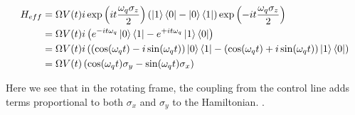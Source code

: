 \begin{fullwidth}
\begin{align}
    H_{eff} &= \Omega V(t) i \exp\left(it\frac{\omega_q \sigma_z}{2}\right)  (\ket{1}\bra{0} - \ket{0}\bra{1} )\exp\left(-it\frac{\omega_q \sigma_z}{2}\right) \\
            &= \Omega V(t) i \left(e^{-it\omega_q}\ket{0}\bra{1} -  e^{+it\omega_q}\ket{1}\bra{0} \right) \\
            &= \Omega V(t) i \left(\left(\cos(\omega_q t) - i\sin(\omega_q t)\right)\ket{0}\bra{1} -  \left(\cos(\omega_q t) + i\sin(\omega_q t)\right)\ket{1}\bra{0} \right) \\
            &= \Omega V(t) \left(\cos(\omega_q t)\sigma_y - \sin(\omega_q t) \sigma_x \right)
\end{align}
\end{fullwidth}
Here we see that in the rotating frame, the coupling from the control line adds terms proportional to both $\sigma_x$ and $\sigma_y$ to the Hamiltonian. \cite{krantz_quantum_2019}. 


